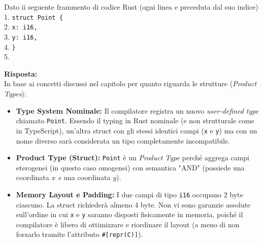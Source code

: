 \begin{exambox}[Domanda 2]
Dato ii seguente frammento di codice Rust (ogni linea e preceduta dal suo indice)\\
1. \texttt{struct Point \{}\\
2. \texttt{x: i16,}\\
3. \texttt{y: i16,}\\
4. \texttt{\}}\\
5. 

\textbf{Risposta:} \\
In base ai concetti discussi nel capitolo per quanto riguarda le strutture (\textit{Product Types}):
\begin{itemize}
    \item \textbf{Type System Nominale:} Il compilatore registra un nuovo \textit{user-defined type} chiamato \texttt{Point}. Essendo il typing in Rust nominale (e non strutturale come in TypeScript), un'altra struct con gli stessi identici campi (\texttt{x} e \texttt{y}) ma con un nome diverso sarà considerata un tipo completamente incompatibile.
    \item \textbf{Product Type (Struct):} \texttt{Point} è un \textit{Product Type} perché aggrega campi eterogenei (in questo caso omogenei) con semantica "AND" (possiede una coordinata $x$ \textit{e} una coordinata $y$).
    \item \textbf{Memory Layout e Padding:} I due campi di tipo \texttt{i16} occupano 2 byte ciascuno. La struct richiederà almeno 4 byte. Non vi sono garanzie assolute sull'ordine in cui \texttt{x} e \texttt{y} saranno disposti fisicamente in memoria, poiché il compilatore è libero di ottimizzare e riordinare il layout (a meno di non forzarlo tramite l'attributo \texttt{\#[repr(C)]}).
\end{itemize}
\end{exambox}
